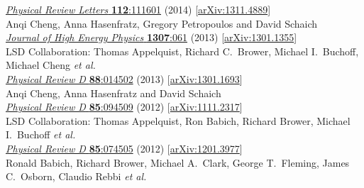\begin{spacelistout}
\begin{revnumerate}
      \href{http://dx.doi.org/10.1103/PhysRevLett.112.111601}{\textit{Physical Review Letters} \textbf{112}:111601} (2014) [\href{http://arxiv.org/abs/1311.4889}{arXiv:1311.4889}]
    \pagebreakitem
       \\
      Anqi Cheng, Anna Hasenfratz, Gregory Petropoulos and David Schaich \\
      \href{http://dx.doi.org/10.1007/JHEP07(2013)061}{\textit{Journal of High Energy Physics} \textbf{1307}:061} (2013) [\href{http://arxiv.org/abs/1301.1355}{arXiv:1301.1355}]
    \pagebreakitem
       \\
      LSD Collaboration: Thomas Appelquist, Richard C.~Brower, Michael I.~Buchoff, Michael Cheng \textit{et al.} \\ %
      \href{http://dx.doi.org/10.1103/PhysRevD.88.014502}{\textit{Physical Review D} \textbf{88}:014502} (2013) [\href{http://arxiv.org/abs/1301.1693}{arXiv:1301.1693}]
    \pagebreakitem
       \\
      Anqi Cheng, Anna Hasenfratz and David Schaich \\
      \href{http://dx.doi.org/10.1103/PhysRevD.85.094509}{\textit{Physical Review D} \textbf{85}:094509} (2012) [\href{http://arxiv.org/abs/1111.2317}{arXiv:1111.2317}]
    \pagebreakitem
       \\
      LSD Collaboration: Thomas Appelquist, Ron Babich, Richard Brower, Michael I.~Buchoff \textit{et al.} \\ %
      \href{http://dx.doi.org/10.1103/PhysRevD.85.074505}{\textit{Physical Review D} \textbf{85}:074505} (2012) [\href{http://arxiv.org/abs/1201.3977}{arXiv:1201.3977}]
    \pagebreakitem
       \\
      Ronald Babich, Richard Brower, Michael A.~Clark, George T.~Fleming, James C.~Osborn, Claudio Rebbi \textit{et al.} \\ %

\end{revnumerate}
\end{spacelistout}
